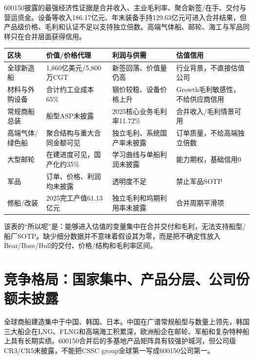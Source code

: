 600150披露的最强经济性证据是合并收入、主业毛利率、聚合新签/在手、交付与营运资金。设备等收入186.17亿元、年末装备手持129.63亿元可进入合并结果，但产品级价格、毛利和认证不足以支持独立倍数。高端气体船、邮轮、海工与军品同样只在合并层面获得信用。

\begin{exhibitbox}[价值链经济性与估值许可]
\small
\begin{tabularx}{\exhibitboxwidth}{L{2.8cm}L{3.6cm}L{3.5cm}X}
\toprule
\textbf{区块} & \textbf{价值/价格代理} & \textbf{利润与供需} & \textbf{估值信用} \\
\midrule
全球新造船 & 1,860亿美元/5,800万CGT & 新签回落、价值量仍高 & 行业背景，不直接估值公司 \\
材料与外购设备 & 合计约工业成本65\% & 钢价较稳、设备价格上升 & Growth毛利敏感性，不给供应商信用 \\
常规商船总装 & 船型ASP未披露 & 2025核心业务毛利率11.72\% & 合并收入/毛利情景可用 \\
高端气体/绿色船 & 聚合结构与重大合同金额可见 & 独立毛利、系统国产率未披露 & 订单质量，不给高端独立倍数 \\
大型邮轮 & 在建进度可见，国产化约35\% & 学习曲线与单船利润未披露 & 能力期权，基础信用0 \\
军品 & 订单、价格、利润均未披露 & 透明度不足 & 禁止军品SOTP \\
修船/改装 & 2025完工产值61.13亿元 & 独立毛利和坞期利用率未披露 & 合并周期平滑项 \\
\bottomrule
\end{tabularx}
\end{exhibitbox}

该表的“所以呢”是：能够进入估值的变量集中在合并交付和毛利，无法支持船型/船厂SOTP。缺少细分数据并不意味着假设其为零，而是把不确定性放入Bear/Base/Bull的交付、价格/结构和毛利率区间。

\section{竞争格局：国家集中、产品分层、公司份额未披露}

全球商船建造集中于中国、韩国、日本。中国在广谱常规船型与数量上领先，韩国三大船企在LNG、FLNG和高端海工积累深，欧洲船企在邮轮、军船和复杂特种船上具有长期实绩。600150合并后的多基地产品矩阵具有较强护城河，但公司级CR3/CR5未披露，不能把CSSC group全球第一写成600150公司第一。

